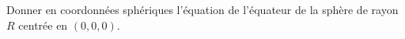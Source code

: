 
\begin{exercice}\label{exoOutilsMath-0025}

 Donner en coordonnées sphériques l'équation de l'équateur de la sphère de rayon $R$ centrée en $(0,0,0)$.

\end{exercice}
